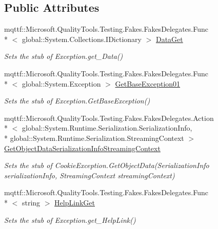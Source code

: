 \subsection*{Public Attributes}
\begin{DoxyCompactItemize}
\item 
mqttf\-::\-Microsoft.\-Quality\-Tools.\-Testing.\-Fakes.\-Fakes\-Delegates.\-Func\\*
$<$ global\-::\-System.\-Collections.\-I\-Dictionary $>$ \hyperlink{class_system_1_1_net_1_1_fakes_1_1_stub_cookie_exception_aeb201bd2115e69c44fad955cce461481}{Data\-Get}
\begin{DoxyCompactList}\small\item\em Sets the stub of Exception.\-get\-\_\-\-Data()\end{DoxyCompactList}\item 
mqttf\-::\-Microsoft.\-Quality\-Tools.\-Testing.\-Fakes.\-Fakes\-Delegates.\-Func\\*
$<$ global\-::\-System.\-Exception $>$ \hyperlink{class_system_1_1_net_1_1_fakes_1_1_stub_cookie_exception_ac04d1154ddd4ebfd5e6543b178f9aa9d}{Get\-Base\-Exception01}
\begin{DoxyCompactList}\small\item\em Sets the stub of Exception.\-Get\-Base\-Exception()\end{DoxyCompactList}\item 
mqttf\-::\-Microsoft.\-Quality\-Tools.\-Testing.\-Fakes.\-Fakes\-Delegates.\-Action\\*
$<$ global\-::\-System.\-Runtime.\-Serialization.\-Serialization\-Info, \\*
global\-::\-System.\-Runtime.\-Serialization.\-Streaming\-Context $>$ \hyperlink{class_system_1_1_net_1_1_fakes_1_1_stub_cookie_exception_aeaec64d7763f3c1e6d10c736dae40ceb}{Get\-Object\-Data\-Serialization\-Info\-Streaming\-Context}
\begin{DoxyCompactList}\small\item\em Sets the stub of Cookie\-Exception.\-Get\-Object\-Data(\-Serialization\-Info serialization\-Info, Streaming\-Context streaming\-Context)\end{DoxyCompactList}\item 
mqttf\-::\-Microsoft.\-Quality\-Tools.\-Testing.\-Fakes.\-Fakes\-Delegates.\-Func\\*
$<$ string $>$ \hyperlink{class_system_1_1_net_1_1_fakes_1_1_stub_cookie_exception_aa469ea6b27c112da85836f785b540543}{Help\-Link\-Get}
\begin{DoxyCompactList}\small\item\em Sets the stub of Exception.\-get\-\_\-\-Help\-Link()\end{DoxyCompactList}\item 

\end{DoxyCompactItemize}
